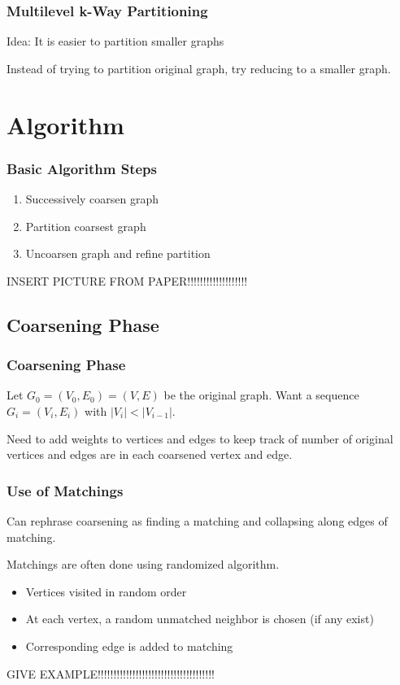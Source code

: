 \documentclass{beamer}
\begin{document}
\begin{frame}
  \frametitle{Multilevel k-Way Partitioning}

  \begin{block}{Idea:}
    It is easier to partition smaller graphs
  \end{block}

  Instead of trying to partition original graph, try reducing to a smaller graph.

\end{frame}

\section{Algorithm}

\begin{frame}
  \frametitle{Basic Algorithm Steps}

  \begin{enumerate}
    \item
      Successively coarsen graph
    \item
      Partition coarsest graph
    \item
      Uncoarsen graph and refine partition
  \end{enumerate}

  INSERT PICTURE FROM PAPER!!!!!!!!!!!!!!!!!!!

\end{frame}

\subsection{Coarsening Phase}

\begin{frame}
  \frametitle{Coarsening Phase}

  Let $G_0 = (V_0, E_0) = (V,E)$ be the original graph. Want a sequence $G_i = (V_i, E_i)$ with $|V_i| < |V_{i-1}|$.

  Need to add weights to vertices and edges to keep track of number of original vertices and edges are in each coarsened vertex and edge.

\end{frame}

\begin{frame}
  \frametitle{Use of Matchings}

  Can rephrase coarsening as finding a matching and collapsing along edges of matching.

  Matchings are often done using randomized algorithm.
  \begin{itemize}
    \item Vertices visited in random order
    \item At each vertex, a random unmatched neighbor is chosen (if any exist)
    \item Corresponding edge is added to matching
  \end{itemize}

  GIVE EXAMPLE!!!!!!!!!!!!!!!!!!!!!!!!!!!!!!!!!!!!!

\end{frame}
\end{document}
